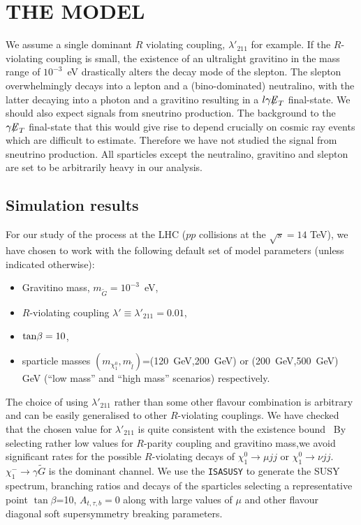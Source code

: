 \documentclass[11pt]{cernrep}
\begin{document}
\section{THE MODEL}
We assume a single dominant $R$ violating coupling, $\lambda'_{211}$
for example. If the $R$-violating coupling is small, the existence
of an ultralight gravitino in the mass range of $10^{-3}$~eV drastically
alters the decay mode of the slepton. The slepton overwhelmingly decays
into a lepton and a (bino-dominated) neutralino, with the latter decaying
into a photon and a gravitino resulting in a $l\gamma{\not\!\!E}_{T}$ final-state.
We should also expect signals from sneutrino production.
The background to the $\gamma{\not\!\!E}_{T}$ final-state that this would give rise
to depend crucially on cosmic ray events
which are difficult to estimate. Therefore we have not studied the signal
from sneutrino production. All sparticles except the neutralino,
gravitino and slepton are set to be arbitrarily heavy in our analysis.

\subsection{Simulation results}
For our study of the process  at the LHC ($pp$
collisions at the $\sqrt s = 14$ TeV), we have chosen to work with the
following default set of model parameters (unless indicated otherwise):
\begin{itemize}
\item
Gravitino mass, $m_{\tilde G}=10^{-3}$~eV,
\item
$R$-violating coupling $\lambda'\equiv\lambda'_{211}=0.01$,
\item
${\rm tan}\beta = 10$,
\item
sparticle masses $(m_{\chi_1^0}, m_{\tilde l})$=(120~GeV,200~GeV) or
(200~GeV,500~GeV)
GeV (``low mass'' and ``high mass'' scenarios) respectively.
\end{itemize}
The choice of using $\lambda'_{211}$ rather than some other flavour
combination is arbitrary and can be easily generalised to other
$R$-violating couplings. We have checked that the chosen value for
$\lambda'_{211}$ is quite consistent with the existence bound~
By selecting rather low values for $R$-parity
coupling and gravitino mass,we avoid
significant rates for the possible $R$-violating decays of $\chi_1^0
\rightarrow \mu jj$ or $\chi_1^0 \rightarrow \nu jj$. $\chi_1^- \rightarrow
\gamma {\tilde G}$ is the dominant channel.
We use the {\small \tt ISASUSY} to generate the
SUSY spectrum, branching ratios and decays of the sparticles selecting
a representative point $\tan\beta$=10, $A_{t,\tau,b}=0$ along with
large values of  $\mu$ and other flavour diagonal soft
supersymmetry breaking parameters.
\end{document}
